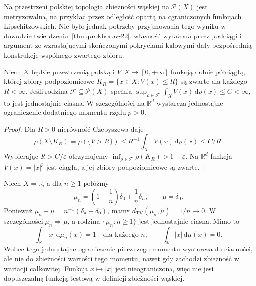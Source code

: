 \begin{uwaga}
Na przestrzeni polskiej topologia zbieżności wąskiej
na $\mathcal P(X)$ jest metryzowalna, na przykład przez
odległość opartą na ograniczonych funkcjach Lipschitzowskich.
Nie było jednak potrzeby przyjmowania tego wyniku
w dowodzie twierdzenia~\ref{thm:prokhorov-22}:
własność wyrażona przez podciągi i argument ze
wzrastającymi skończonymi pokryciami kulowymi
dały bezpośrednią konstrukcję wspólnego zwartego zbioru.
\end{uwaga}

\begin{wniosek}
\label{cor:coercive-tight-22}
Niech $X$ będzie przestrzenią polską i
$V:X\to[0,+\infty]$ funkcją dolnie półciągłą,
której zbiory podpoziomicowe
$K_R=\{x\in X:V(x)\le R\}$ są zwarte dla każdego
$R<\infty$. Jeśli rodzina $\mathcal F\subseteq\mathcal P(X)$
spełnia
$\sup_{\rho\in\mathcal F}\int_X V(x)\,\mathrm d\rho(x)
\le C<\infty$, to jest jednostajnie ciasna.
W szczególności na $\mathbb R^d$ wystarcza jednostajne
ograniczenie dodatniego momentu rzędu $p>0$.
\end{wniosek}
\begin{proof}
Dla $R>0$ nierówność Czebyszewa daje
\[
 \rho(X\setminus K_R)=\rho(\{V>R\})
 \le R^{-1}\int_X V(x)\,\mathrm d\rho(x)\le C/R.
\]
Wybierając $R>C/\varepsilon$ otrzymujemy
$\inf_{\rho\in\mathcal F}\rho(K_R)>1-\varepsilon$.
Na $\mathbb R^d$ funkcja $V(x)=|x|^p$ jest ciągła,
a jej zbiory podpoziomicowe są zwarte.
\end{proof}

\begin{przyklad}
\label{ex:moment-not-continuous-22}
Niech $X=\mathbb R$, a dla $n\ge1$ połóżmy
\[
 \mu_n=\left(1-\frac1n\right)\delta_0+
 \frac1n\delta_n,\qquad \mu=\delta_0.
\]
Ponieważ $\mu_n-\mu=n^{-1}(\delta_n-\delta_0)$,
mamy $d_{\mathrm{TV}}(\mu_n,\mu)=1/n\to0$.
W szczególności $\mu_n\Rightarrow\mu$, a rodzina
$\{\mu_n:n\ge1\}$ jest jednostajnie ciasna.
Mimo to
\[
 \int_{\mathbb R}|x|\,\mathrm d\mu_n(x)=1
 \quad\text{dla każdego }n,\qquad
 \int_{\mathbb R}|x|\,\mathrm d\mu(x)=0.
\]
Wobec tego jednostajne ograniczenie pierwszego momentu
wystarcza do ciasności, ale nie do zbieżności wartości
tego momentu, nawet gdy zachodzi zbieżność w wariacji
całkowitej. Funkcja $x\mapsto|x|$ jest nieograniczona,
więc nie jest dopuszczalną funkcją testową w definicji
zbieżności wąskiej.
\end{przyklad}

